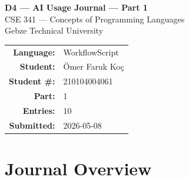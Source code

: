 \documentclass[a4paper,10pt]{article}
\renewcommand{\arraystretch}{1.8}
\begin{document}
\thispagestyle{empty}

\vspace*{3cm}
\begin{center}
  {\LARGE\bfseries\color{headerblue} D4 --- AI Usage Journal --- Part 1}\\[0.6em]
  {\large CSE 341 --- Concepts of Programming Languages}\\[0.3em]
  {\large Gebze Technical University}\\[2.5em]

  \renewcommand{\arraystretch}{1.5}
  \begin{tabular}{r l}
    \textbf{Language:}   & WorkflowScript \\
    \textbf{Student:}    & {Ömer Faruk Koç} \\
    \textbf{Student \#:} & {210104004061} \\
    \textbf{Part:}       & 1 \quad  \\
    \textbf{Entries:}    & 10 \quad \\
    \textbf{Submitted:}  & 2026-05-08 \\
  \end{tabular}
  \renewcommand{\arraystretch}{1.8}


\end{center}

\newpage

\section{Journal Overview}
\end{document}

